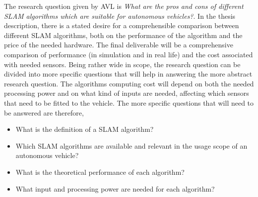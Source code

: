 The research question given by AVL is \textit{What are the pros and cons of
different SLAM algorithms which are suitable for autonomous vehicles?}.  In the
thesis description, there is a stated desire for a comprehensible comparison
between different SLAM algorithms, both on the performance of the algorithm and
the price of the needed hardware. The final deliverable will be a comprehensive
comparison of performance (in simulation and in real life) and the cost
associated with needed sensors. Being rather wide in scope, the research
question can be divided into more specific questions that will help in
answering the more abstract research question. The algorithms computing cost
will depend on both the needed processing power and on what kind of inputs are
needed, affecting which sensors that need to be fitted to the vehicle. The more
specific questions that will need to be answered are therefore,
\begin{itemize}
    \item What is the definition of a SLAM algorithm?
    \item Which SLAM algorithms are available and relevant in the usage scope of an autonomous vehicle?
    \item What is the theoretical performance of each algorithm?
    \item What input and processing power are needed for each algorithm?
    \end{itemize}

